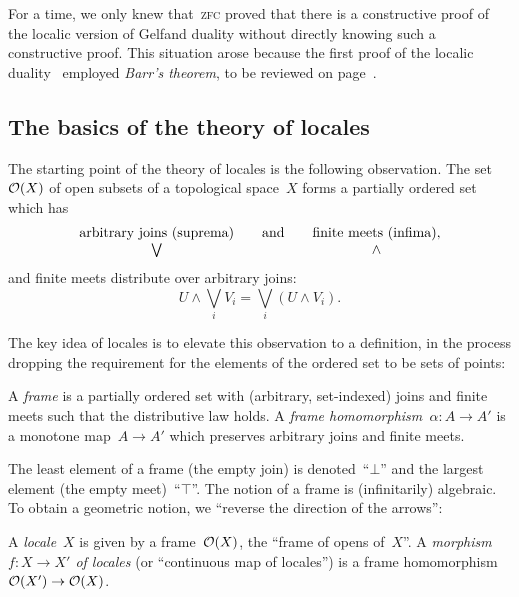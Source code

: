 \documentclass{ws-rv9x6}
\begin{document}
{\begin{remark}For a time, we only knew that~\textsc{zfc} proved that there is a
constructive proof of the localic version of Gelfand duality without directly
knowing such a constructive proof. This situation arose because the first proof
of the localic duality~\cite{banaschewski-mulvey:gelfand} employed \emph{Barr's
theorem}, to be reviewed on page~\pageref{par:barr}.\end{remark}


\subsection{The basics of the theory of locales}

The starting point of the theory of locales is the following
observation. The set~$\mathcal{O}(X)$ of open subsets of a topological
space~$X$ forms a partially ordered set which has
\[ \begin{array}{@{}ccc@{}}
\text{arbitrary joins (suprema)}
&\quad\text{and}\quad&
\text{finite meets (infima)}, \\
\bigvee && \wedge
\end{array} \]
and finite meets distribute over arbitrary joins:
\[ U \wedge \bigvee_i V_i = \bigvee_i (U \wedge V_i). \]

The key idea of locales is to elevate this observation to a definition, in the
process dropping the requirement for the elements of the ordered set to be sets
of points:
\begin{definition}A \emph{frame} is a partially ordered set with (arbitrary,
set-indexed) joins and finite meets such that the distributive law
holds. A \emph{frame homomorphism~$\alpha : A \to A'$} is a monotone map~$A
\to A'$ which preserves arbitrary joins and finite meets.\end{definition}

The least element of a frame (the empty join) is denoted~``$\bot$'' and the
largest element (the empty meet)~``$\top$''. The notion of a frame is
(infinitarily) algebraic. To obtain a geometric notion, we ``reverse the
direction of the arrows'':

\begin{definition}\label{defn:locale}
A \emph{locale}~$X$ is given by a frame~$\mathcal{O}(X)$, the ``frame
of opens of~$X$''. A \emph{morphism~$f : X \to X'$ of locales} (or ``continuous
map of locales'') is a frame homomorphism~$\mathcal{O}(X') \to \mathcal{O}(X)$.\end{definition}

}
\end{document}
